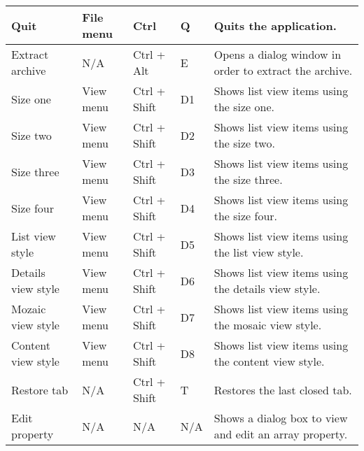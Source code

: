 \documentclass[12pt]{article}
\begin{document}
\begin{tabularx}{\linewidth}{ | X | X | X!{+}X | X | }
\hline

Quit & File menu & Ctrl & Q & Quits the application. \\

\hline

Extract archive & N/A & Ctrl + Alt & E & Opens a dialog window in order to extract the archive. \\

\hline

Size one & View menu & Ctrl + Shift & D1 & Shows list view items using the size one. \\

\hline

Size two & View menu & Ctrl + Shift & D2 & Shows list view items using the size two. \\

\hline

Size three & View menu & Ctrl + Shift & D3 & Shows list view items using the size three. \\

\hline

Size four & View menu & Ctrl + Shift & D4 & Shows list view items using the size four. \\

\hline

List view style & View menu & Ctrl + Shift & D5 & Shows list view items using the list view style. \\

\hline

Details view style & View menu & Ctrl + Shift & D6 & Shows list view items using the details view style. \\

\hline

Mozaic view style & View menu & Ctrl + Shift & D7 & Shows list view items using the mosaic view style. \\

\hline

Content view style & View menu & Ctrl + Shift & D8 & Shows list view items using the content view style. \\

\hline

Restore tab & N/A & Ctrl + Shift & T & Restores the last closed tab. \\

\hline

Edit property & N/A & N/A & N/A & Shows a dialog box to view and edit an array property. \\


\end{tabularx}
\end{document}
